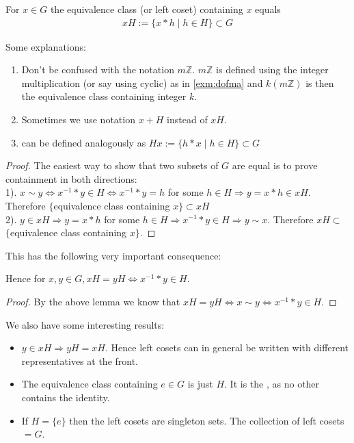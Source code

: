 \documentclass{article}
\begin{document}
\begin{lema}
For $x \in G$ the equivalence class (or left coset) containing $x$ equals
\begin{align*}
x H:=\{x * h \mid h \in H\} \subset G
\end{align*}
\end{lema}
\begin{rema}Some explanations:
\begin{enumerate}
    \item Don't be confused with the notation $m\mathbb{Z}$. $m\mathbb{Z}$ is defined using the integer multiplication (or say using cyclic) as in \cref{exm:dofma} and $k(m\mathbb{Z})$ is then the equivalence class containing integer $k$.
    \item Sometimes we use notation  $x+H$ instead of $xH$.
    \item {} can be defined analogously as $Hx:=\{h * x\mid h \in H\} \subset G$ 
\end{enumerate}

\end{rema}
\begin{proof}
The easiest way to show that two subsets of $G$ are equal is to prove containment in both directions:\\
1). $x \sim y \Longleftrightarrow x^{-1} * y \in H \Longleftrightarrow x^{-1} * y=h$ for some $h \in H \Rightarrow y=x * h \in x H .$ Therefore
$\{$equivalence class containing $x\} \subset x H$\\
2). $y \in x H \Rightarrow y=x * h$ for some $h \in H \Rightarrow x^{-1} * y \in H \Rightarrow y \sim x$. Therefore $x H \subset$
$\{$equivalence class containing $x\}$.
\end{proof}
This has the following very important consequence:
\begin{cora}
Hence for $x, y \in G, x H=y H \Longleftrightarrow x^{-1} * y \in H$.
\end{cora} 
\begin{proof}
By the above lemma we know that $x H=y H \Longleftrightarrow x \sim y \Longleftrightarrow x^{-1} * y \in H .$
\end{proof} 
\begin{rema}We also have some interesting results:
\begin{itemize}
    \item $y \in x H \Rightarrow y H=x H .$ Hence left cosets can in general be written with different representatives at the front.
    \item The equivalence class containing $e \in G$ is just $H .$ It is the , as no other contains the identity. 
    \item If $H=\{e\}$ then the left cosets are singleton sets. The collection of left cosets $= G$.
\end{itemize}
 
\end{rema}
\end{document}

